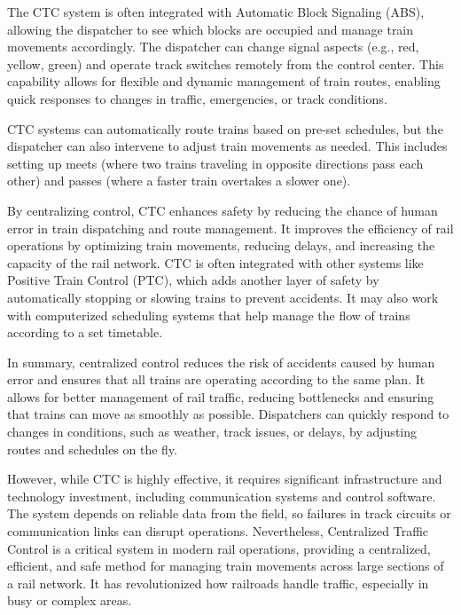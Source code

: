 The CTC system is often integrated with Automatic Block Signaling (ABS), allowing the dispatcher to see which blocks are occupied and manage train movements accordingly. The dispatcher can change signal aspects (e.g., red, yellow, green) and operate track switches remotely from the control center. This capability allows for flexible and dynamic management of train routes, enabling quick responses to changes in traffic, emergencies, or track conditions.

CTC systems can automatically route trains based on pre-set schedules, but the dispatcher can also intervene to adjust train movements as needed. This includes setting up meets (where two trains traveling in opposite directions pass each other) and passes (where a faster train overtakes a slower one).

By centralizing control, CTC enhances safety by reducing the chance of human error in train dispatching and route management. It improves the efficiency of rail operations by optimizing train movements, reducing delays, and increasing the capacity of the rail network. CTC is often integrated with other systems like Positive Train Control (PTC), which adds another layer of safety by automatically stopping or slowing trains to prevent accidents. It may also work with computerized scheduling systems that help manage the flow of trains according to a set timetable.

In summary, centralized control reduces the risk of accidents caused by human error and ensures that all trains are operating according to the same plan. It allows for better management of rail traffic, reducing bottlenecks and ensuring that trains can move as smoothly as possible. Dispatchers can quickly respond to changes in conditions, such as weather, track issues, or delays, by adjusting routes and schedules on the fly.

However, while CTC is highly effective, it requires significant infrastructure and technology investment, including communication systems and control software. The system depends on reliable data from the field, so failures in track circuits or communication links can disrupt operations. Nevertheless, Centralized Traffic Control is a critical system in modern rail operations, providing a centralized, efficient, and safe method for managing train movements across large sections of a rail network. It has revolutionized how railroads handle traffic, especially in busy or complex areas.


